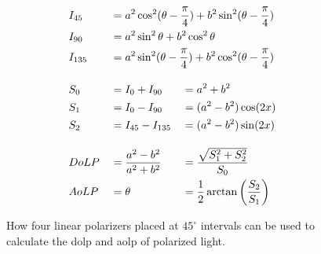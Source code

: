\begin{figure}[H]
\begin{minipage}{.48\textwidth}
\begin{alignat}{3}
             & I_{45}                                                                         & 
             & = \mathrlap{a^2\cos^2(\theta-\frac{\pi}{4}) + b^2\sin^2(\theta-\frac{\pi}{4})} & 
             &                                                                                   \\
             & I_{90}                                                                         & 
             & = \mathrlap{a^2\sin^2\theta + b^2\cos^2\theta                                } & 
             &                                                                                   \\
             & I_{135}                                                                        & 
             & = \mathrlap{a^2\sin^2(\theta-\frac{\pi}{4}) + b^2\cos^2(\theta-\frac{\pi}{4})} & 
             &                                                                                   \\[1em]
             & S_0                                                                            & 
             & = I_0 + I_{90}                                                                 & 
             & = a^2+b^2                                                                         \\
             & S_1                                                                            & 
             & = I_0 - I_{90}                                                                 & 
             & =(a^2-b^2)\cos(2x)                                                                \\
             & S_2                                                                            & 
             & = I_{45} - I_{135}                                                             & 
             & =(a^2-b^2)\sin(2x)                                                                \\[1em]
             & DoLP                                                                           & 
             & =\frac{a^2-b^2}{a^2+b^2}                                                       & 
             & = \frac{\sqrt{S_1^2 + S_2^2}}{S_0}                                                \\
             & AoLP                                                                           & 
             & =  \theta                                                                      & 
             & = \frac{1}{2}\arctan{\left(\frac{S_2}{S_1}\right)}
        \end{alignat}
    \end{minipage}%
    
    \caption{How four linear polarizers placed at $45^\circ$ intervals can be used to calculate the \gls{dolp} and \gls{aolp} of polarized light. \label{fig:polarization_calculation}}
\end{figure}%

